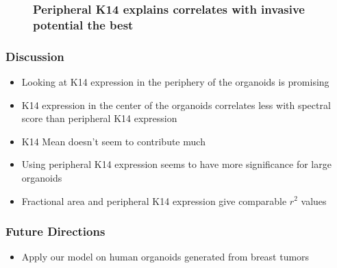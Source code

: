 \documentclass{beamer} %
\begin{document}
\begin{frame}
	\begin{figure}
		\frametitle{Peripheral K14 explains correlates with invasive potential the best}
		\centering
	\end{figure}
\end{frame}

\begin{frame}
	\frametitle{Discussion}
	\begin{itemize}
			\item Looking at K14 expression in the periphery of the organoids is promising
			\item K14 expression in the center of the organoids correlates less with spectral score than peripheral K14 expression 
			\item K14 Mean doesn't seem to contribute much
			\item Using peripheral K14 expression seems to have more significance for large organoids 
			\item Fractional area and peripheral K14 expression give comparable $r^2$ values
	\end{itemize}
\end{frame}

\begin{frame}
	\frametitle{Future Directions}
	\begin{itemize}
			\item Apply our model on human organoids generated from breast tumors 
			\newline
	\end{itemize}
\end{frame}
\end{document}
